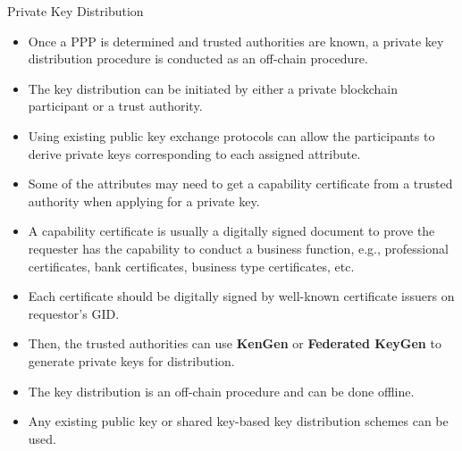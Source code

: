 \documentclass[11pt]{beamer}
\begin{document}
\begin{frame}[allowframebreaks]{Private Key Distribution}

\begin{itemize}

\item Once a PPP is determined and trusted authorities are known, a private key distribution procedure is conducted as an off-chain procedure.
\item The key distribution can be initiated by either a private blockchain participant or a trust authority.
\item  Using existing public key exchange protocols can allow the participants to derive private keys corresponding to each assigned attribute.
\item Some of the attributes may need to get a capability certificate from a trusted authority when applying for a private key.
\item A capability certificate is usually a digitally signed document to prove the requester has the capability to conduct a business function, e.g., professional certificates, bank certificates, business type certificates, etc.
\item  Each certificate should be digitally signed by well-known certificate issuers on requestor’s GID.
\item Then, the trusted authorities can use \textbf{KenGen} or \textbf{Federated KeyGen} to generate private keys for distribution.
\item The key distribution is an off-chain procedure and can be done offline.
\item Any existing public key or shared key-based key distribution schemes can be used.

\end{itemize}

\end{frame}
\end{document}
